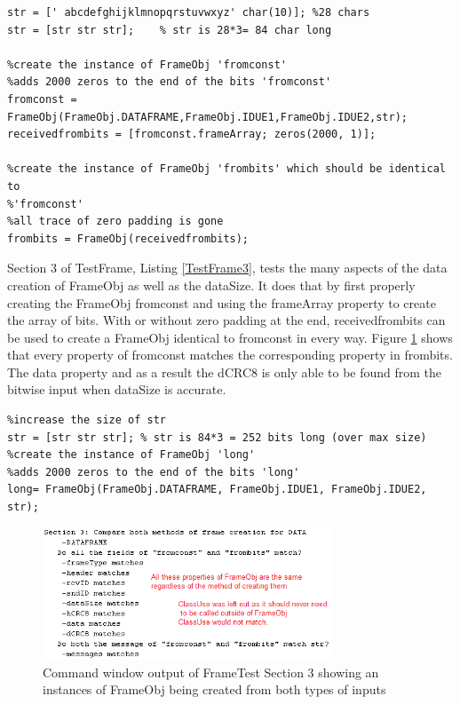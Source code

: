\begin{lstlisting} 
str = [' abcdefghijklmnopqrstuvwxyz' char(10)]; %28 chars
str = [str str str];    % str is 28*3= 84 char long

%create the instance of FrameObj 'fromconst'
%adds 2000 zeros to the end of the bits 'fromconst'
fromconst = FrameObj(FrameObj.DATAFRAME,FrameObj.IDUE1,FrameObj.IDUE2,str);
receivedfrombits = [fromconst.frameArray; zeros(2000, 1)];

%create the instance of FrameObj 'frombits' which should be identical to
%'fromconst' 
%all trace of zero padding is gone
frombits = FrameObj(receivedfrombits);
\end{lstlisting} 

Section 3 of TestFrame, Listing \ref{TestFrame3}, tests the many aspects of the data creation of FrameObj as well as the dataSize. It does that by first properly creating the FrameObj fromconst and using the frameArray property to create the array of bits. With or without zero padding at the end, receivedfrombits can be used to create a FrameObj identical to fromconst in every way. Figure \ref{fig:FrameTest3} shows that every property of fromconst matches the corresponding property in frombits. The data property and as a result the dCRC8 is only able to be found from the bitwise input when dataSize is accurate.   

\begin{lstlisting} 
%increase the size of str
str = [str str str]; % str is 84*3 = 252 bits long (over max size)
%create the instance of FrameObj 'long'
%adds 2000 zeros to the end of the bits 'long'
long= FrameObj(FrameObj.DATAFRAME, FrameObj.IDUE1, FrameObj.IDUE2, str);
\end{lstlisting} 
\begin{figure}[h]
    \includegraphics[width=0.77\textwidth, left]{FrameTest3.PNG}
    \caption{Command window output of FrameTest Section 3 showing an instances of FrameObj being created from both types of inputs }
    \label{fig:FrameTest3}
\end{figure}

